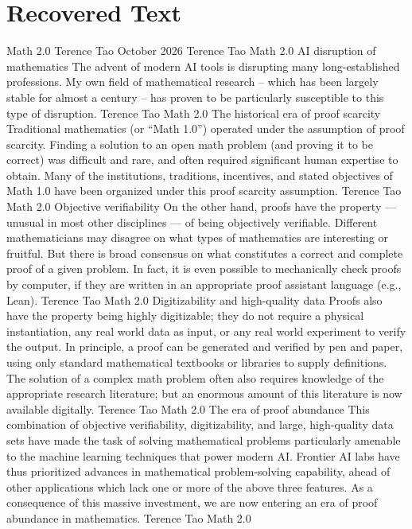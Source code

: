 \section{Recovered Text}
Math 2.0
Terence Tao
October 2026
Terence Tao
Math 2.0
AI disruption of mathematics
The advent of modern AI tools is disrupting many
long-established professions.
My own field of mathematical research – which has been
largely stable for almost a century – has proven to be
particularly susceptible to this type of disruption.
Terence Tao
Math 2.0
The historical era of proof scarcity
Traditional mathematics (or “Math 1.0”) operated under the
assumption of proof scarcity.
Finding a solution to an open math problem (and proving it
to be correct) was difficult and rare, and often required
significant human expertise to obtain.
Many of the institutions, traditions, incentives, and stated
objectives of Math 1.0 have been organized under this
proof scarcity assumption.
Terence Tao
Math 2.0
Objective verifiability
On the other hand, proofs have the property — unusual in
most other disciplines — of being objectively verifiable.
Different mathematicians may disagree on what types of
mathematics are interesting or fruitful.
But there is broad consensus on what constitutes a correct
and complete proof of a given problem.
In fact, it is even possible to mechanically check proofs by
computer, if they are written in an appropriate proof
assistant language (e.g., Lean).
Terence Tao
Math 2.0
Digitizability and high-quality data
Proofs also have the property being highly digitizable; they
do not require a physical instantiation, any real world data
as input, or any real world experiment to verify the output.
In principle, a proof can be generated and verified by pen
and paper, using only standard mathematical textbooks or
libraries to supply definitions.
The solution of a complex math problem often also
requires knowledge of the appropriate research literature;
but an enormous amount of this literature is now available
digitally.
Terence Tao
Math 2.0
The era of proof abundance
This combination of objective verifiability, digitizability, and
large, high-quality data sets have made the task of solving
mathematical problems particularly amenable to the
machine learning techniques that power modern AI.
Frontier AI labs have thus prioritized advances in
mathematical problem-solving capability, ahead of other
applications which lack one or more of the above three
features.
As a consequence of this massive investment, we are now
entering an era of proof abundance in mathematics.
Terence Tao
Math 2.0
